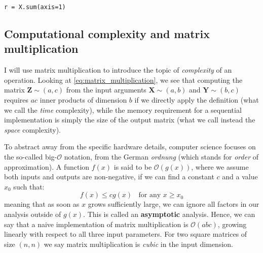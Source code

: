 {\small
\begin{center}\texttt{r = X.sum(axis=1)}\end{center}
}

\subsection*{Computational complexity and matrix multiplication \addteacup} 

I will use matrix multiplication to introduce the topic of \textit{complexity} of an operation.  Looking at \eqref{eq:matrix_multiplication}, we see that computing the matrix $\mathbf{Z} \sim (a,c)$ from the input arguments $\mathbf{X} \sim (a,b)$ and $\mathbf{Y} \sim (b,c)$ requires $ac$ inner products of dimension $b$ if we directly apply the definition (what we call the \textit{time} complexity), while the memory requirement for a sequential implementation is simply the size of the output matrix (what we call instead the \textit{space} complexity).

To abstract away from the specific hardware details, computer science focuses on the so-called big-$\mathcal{O}$ notation, from the German \textit{ordnung} (which stands for \textit{order} of approximation). A function $f(x)$ is said to be $\mathcal{O}(g(x))$, where we assume both inputs and outputs are non-negative, if we can find a constant $c$ and a value $x_0$ such that:
%
\begin{equation}
f(x) \le cg(x) \;\; \text{ for any } x \ge x_0
\end{equation}
%
meaning that as soon as $x$ grows sufficiently large, we can ignore all factors in our analysis outside of $g(x)$. This is called an \textbf{asymptotic} analysis. Hence, we can say that a naive implementation of matrix multiplication is $\mathcal{O}(abc)$, growing linearly with respect to all three input parameters. For two square matrices of size $(n,n)$ we say matrix multiplication is \textit{cubic} in the input dimension.

